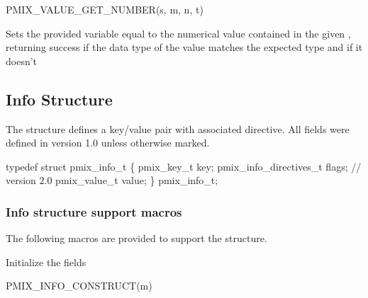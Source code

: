 \cspecificstart
\begin{codepar}
PMIX_VALUE_GET_NUMBER(s, m, n, t)
\end{codepar}
\cspecificend

\begin{arglist}
\end{arglist}

Sets the provided variable equal to the numerical value contained in the given , returning success if the data type of the value matches the expected type and  if it doesn't

\subsection{Info Structure}
\label{chap:struct:info}

The  structure defines a key/value pair with associated directive. All fields were defined in version 1.0 unless otherwise marked.

\cspecificstart
\begin{codepar}
typedef struct pmix_info_t \{
    pmix_key_t key;
    pmix_info_directives_t flags;    // version 2.0
    pmix_value_t value;
\} pmix_info_t;
\end{codepar}
\cspecificend

\subsubsection{Info structure support macros}
The following macros are provided to support the  structure.


Initialize the  fields

\cspecificstart
\begin{codepar}
PMIX_INFO_CONSTRUCT(m)
\end{codepar}
\cspecificend

\begin{arglist}
\end{arglist}

